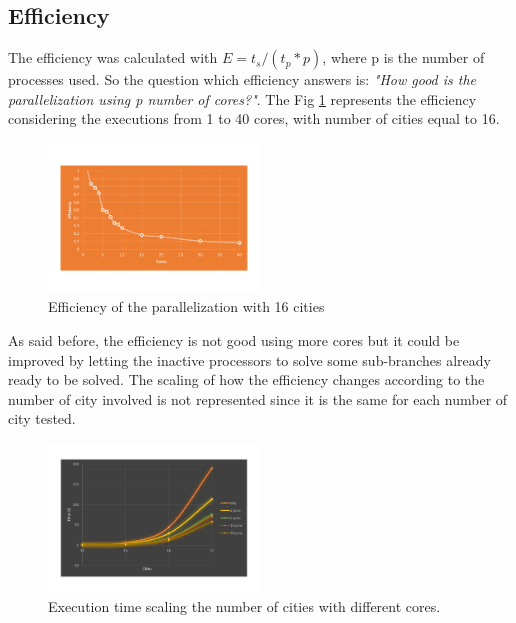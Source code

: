 \documentclass[11pt,conference]{IEEEtran}
\begin{document}
\subsection{Efficiency}
The efficiency was calculated with $ E = t_s / (t_p * p)$, where p is the number of processes used. So the question which efficiency answers is: \textit{"How good is the parallelization using p number of cores?"}. The Fig \ref{fig:efficiency} represents the efficiency considering the executions from 1 to 40 cores, with number of cities equal to 16.

\begin{figure}[h!]
  \centering
    \includegraphics[trim=0.0cm 3.5cm 0.0cm 3.5cm, width=0.5\textwidth]{efficiency}
    \caption{Efficiency of the parallelization with 16 cities}
    \label{fig:efficiency}
\end{figure}

As said before, the efficiency is not good using more cores but it could be improved by letting the inactive processors to solve some sub-branches already ready to be solved.
\newline
The scaling of how the efficiency changes according to the number of city involved is not represented since it is the same for each number of city tested.

\begin{figure}[h!]
  \centering
    \includegraphics[width=0.5\textwidth]{time-comparsion}
    \caption{Execution time scaling the number of cities with different cores.}
    \label{fig:time-comparsion}
\end{figure}
\end{document}
